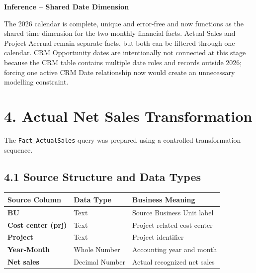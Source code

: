 \documentclass[11pt,a4paper]{article}
\begin{document}
\begin{inferencebox}

\textbf{Inference -- Shared Date Dimension}

The 2026 calendar is complete, unique and error-free and now functions as the
shared time dimension for the two monthly financial facts. Actual Sales and
Project Accrual remain separate facts, but both can be filtered through one
calendar. CRM Opportunity dates are intentionally not connected at this stage
because the CRM table contains multiple date roles and records outside 2026;
forcing one active CRM Date relationship now would create an unnecessary
modelling constraint.

\end{inferencebox}


\section{4. Actual Net Sales Transformation}

The \texttt{Fact\_ActualSales} query was prepared using a controlled
transformation sequence.

\subsection{4.1 Source Structure and Data Types}

\begin{tabularx}{\textwidth}{
    >{\bfseries}p{4.5cm}
    p{4cm}
    X
}

\toprule

Source Column
&
Data Type
&
Business Meaning
\\

\midrule

BU
&
Text
&
Source Business Unit label
\\

Cost center (prj)
&
Text
&
Project-related cost center
\\

Project
&
Text
&
Project identifier
\\

Year-Month
&
Whole Number
&
Accounting year and month
\\

Net sales
&
Decimal Number
&
Actual recognized net sales
\\

\bottomrule

\end{tabularx}
\end{document}
